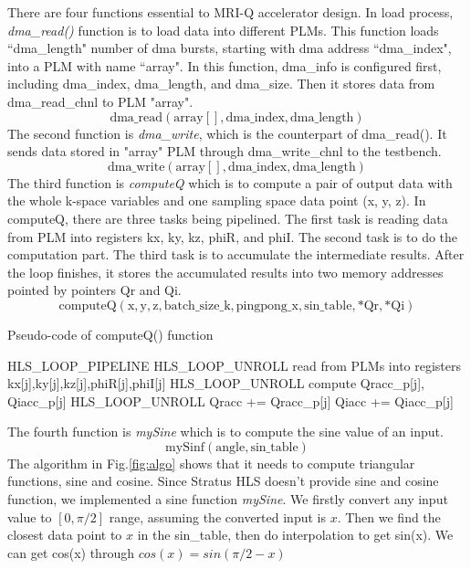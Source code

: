 There are four functions essential to MRI-Q accelerator design. In load process,
\textit{dma\_read()} function is to load data into different PLMs. This
function loads ``dma\_length" number of dma bursts, starting with dma 
address ``dma\_index",
into a PLM with name ``array". In this function, dma\_info is configured first,
including dma\_index, dma\_length, and dma\_size. Then it stores data from
dma\_read\_chnl to PLM "array".
%
$$\mathrm{dma\_read(array[], dma\_index, dma\_length)}$$
%
The second function is \textit{dma\_write}, which is the counterpart of
dma\_read(). It sends data stored in "array" PLM through dma\_write\_chnl to
the testbench.
%
$$\mathrm{dma\_write(array[], dma\_index, dma\_length)}$$
%
The third function is \textit{computeQ} which is to compute a pair of output
data with the whole k-space variables and one sampling space data point (x, y,
z). In computeQ, there are three tasks being pipelined. The first task is
reading data from PLM into registers kx, ky, kz, phiR, and phiI. The second task
is to do the computation part. The third task is to accumulate the intermediate
results. After the loop finishes, it stores the accumulated results into two
memory addresses pointed by pointers Qr and Qi.
%
$$\mathrm{computeQ(x, y, z, batch\_size\_k, pingpong\_x, sin\_table, *Qr, *Qi)}$$


\begin{algorithm}
\caption{Pseudo-code of computeQ() function}
\label{fig-data-convert}
\begin{algorithmic} 
\STATE HLS\_LOOP\_PIPELINE
\STATE HLS\_LOOP\_UNROLL
\STATE read from PLMs into registers 
\STATE \quad kx[j],ky[j],kz[j],phiR[j],phiI[j]
\ENDFOR
{}
\STATE HLS\_LOOP\_UNROLL
\STATE compute Qracc\_p[j], Qiacc\_p[j]
\ENDFOR
{}
\STATE HLS\_LOOP\_UNROLL
\STATE Qracc += Qracc\_p[j]
\STATE Qiacc += Qiacc\_p[j]
\ENDFOR
\ENDFOR
\end{algorithmic}
\end{algorithm}


The fourth function is \textit{mySine} which is to compute the sine value of an
input.
%
$$\mathrm{mySinf(angle, sin\_table)}$$
%
The algorithm in Fig.\ref{fig:algo} shows
that it needs to compute triangular functions, sine and cosine. Since Stratus
HLS doesn't provide sine and cosine function, we implemented a sine function
\textit{mySine}. We firstly convert any input value to $[0,  \pi/2]$ range, assuming the converted input is $x$.
Then we find the closest data point to $x$ in the sin\_table, then do interpolation
to get sin(x). We can get cos(x) through $cos(x) = sin(\pi/2 - x)$ \\

